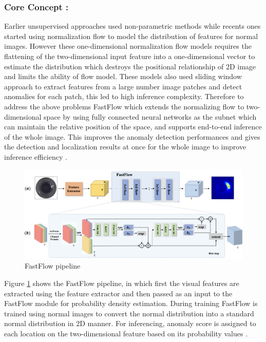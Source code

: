 \subsubsection*{Core Concept :}

Earlier unsupervised approaches used non-parametric methods while recents ones started using normalization flow to model the distribution of features for normal images. However these one-dimensional normalization flow models  requires the flattening of the two-dimensional input feature into a one-dimensional vector to estimate the distribution which destroys the positional relationship of 2D image and limits the ability of flow model. These models also used sliding window approach to extract features from a large number image patches and detect anomalies for each patch, this led to high inference complexity. Therefore to address the above problems FastFlow which extends the normalizing flow to two-dimensional space by using fully connected neural networks as the subnet which can maintain the relative position of the space, and supports end-to-end inference of the whole image. This improves the anomaly detection performances and gives the detection and localization results at once for the whole image to improve inference efficiency \cite{yu2021fastflowunsupervisedanomalydetection}.

\begin{figure}[ht!]
    \centering
    \includegraphics[width=1.1\linewidth]{Rohit_Master_Thesis//Images/fastflow_pipeline.png}
    \caption{FastFlow pipeline\cite{yu2021fastflowunsupervisedanomalydetection}}
    \label{fig:fastflow pipeline}
\end{figure}

Figure \ref{fig:fastflow pipeline} shows the FastFlow pipeline, in which first the visual features are extracted using the feature extractor and then passed as an input to the FastFlow module for probability density estimation. During training FastFlow is trained using normal images to convert the normal distribution into a standard normal distribution in 2D manner. For inferencing, anomaly score is assigned  to each location on the two-dimensional feature based on its probability values \cite{yu2021fastflowunsupervisedanomalydetection}.

